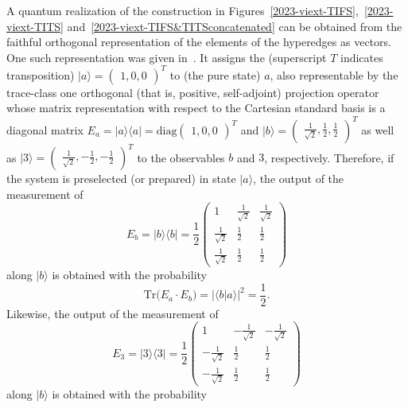 \documentclass[%
 superscriptaddress,
  preprint,
 showpacs,
 showkeys,
 nofootinbib,
  amsmath,amssymb,
  aps,
 pra,
  longbibliography,
  floatfix,
 ]{revtex4-2}
\theoremstyle{definition}
\begin{document}
A quantum realization of the construction  in Figures~\ref{2023-viext-TIFS},~\ref{2023-viext-TITS} and~\ref{2023-viext-TIFS&TITSconcatenated}
can be obtained from the faithful orthogonal representation of the elements of the hyperedges as vectors.
One such representation was given in~\cite[Table~I]{2018-minimalYIYS}.
It assigns the  (superscript $T$ indicates transposition)
$\vert a \rangle = \begin{pmatrix}1,0,0\end{pmatrix}^T$ to (the pure state) $a$,
also representable by the trace-class one orthogonal (that is, positive, self-adjoint) projection operator
whose matrix representation with respect to the Cartesian standard basis
is a diagonal matrix
$E_a=\vert a \rangle \langle a \vert = \text{diag}\begin{pmatrix} 1,0,0 \end{pmatrix}^T$
and
$\vert b \rangle = \begin{pmatrix}\frac{1}{\sqrt{2}},\frac{1}{2},\frac{1}{2}\end{pmatrix}^T$
as well as
$\vert 3 \rangle = \begin{pmatrix}\frac{1}{\sqrt{2}},-\frac{1}{2},-\frac{1}{2}\end{pmatrix}^T$
to the observables $b$ and $3$, respectively.
Therefore, if the system is preselected (or prepared) in state $\vert a \rangle$, the output of the
measurement of
\begin{equation*}
E_b=\vert b \rangle \langle b \vert =  \frac{1}{2}
\begin{pmatrix}
1&\frac{1}{\sqrt{2}}&\frac{1}{\sqrt{2}} \\
\frac{1}{\sqrt{2}}&\frac{1}{2}&\frac{1}{2} \\
\frac{1}{\sqrt{2}}&\frac{1}{2}&\frac{1}{2}
\end{pmatrix}
\end{equation*}
along  $\vert b \rangle$
 is obtained with the probability
\begin{equation*}
\text{Tr}\big(E_a \cdot E_b \big) = \vert \langle b \vert a \rangle \vert^2 = \frac12.
\end{equation*}
Likewise, the output of the
measurement of
\begin{equation*}
E_3=\vert 3 \rangle \langle 3 \vert =  \frac{1}{2}
\begin{pmatrix}
1&-\frac{1}{\sqrt{2}}&-\frac{1}{\sqrt{2}} \\
-\frac{1}{\sqrt{2}}&\frac{1}{2}&\frac{1}{2} \\
-\frac{1}{\sqrt{2}}&\frac{1}{2}&\frac{1}{2}
\end{pmatrix}
\end{equation*}
along  $\vert b \rangle$
 is obtained with the probability
\end{document}
